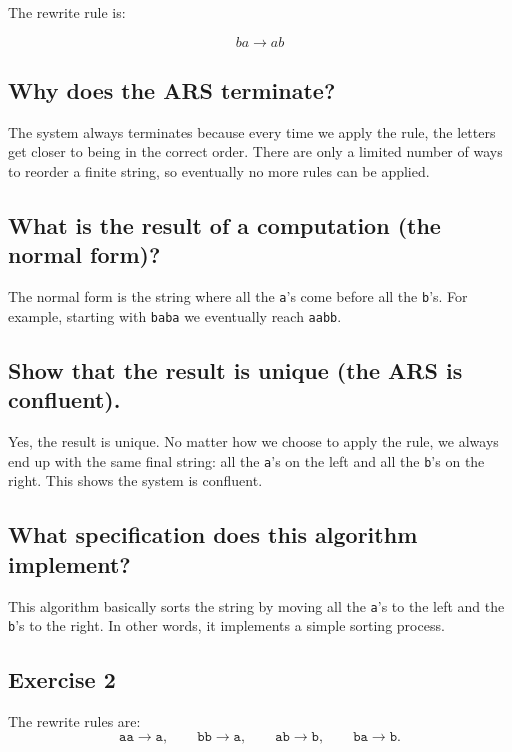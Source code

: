 \documentclass[12pt]{article}
\begin{document}
The rewrite rule is:

\[
    ba \to ab
\]

\subsection*{Why does the ARS terminate?}
The system always terminates because every time we apply the rule, the letters get closer to being in the correct order. There are only a limited number of ways to reorder a finite string, so eventually no more rules can be applied.

\subsection*{What is the result of a computation (the normal form)?}
The normal form is the string where all the \texttt{a}'s come before all the \texttt{b}'s. For example, starting with \texttt{baba} we eventually reach \texttt{aabb}.

\subsection*{Show that the result is unique (the ARS is confluent).}
Yes, the result is unique. No matter how we choose to apply the rule, we always end up with the same final string: all the \texttt{a}'s on the left and all the \texttt{b}'s on the right. This shows the system is confluent.

\subsection*{What specification does this algorithm implement?}
This algorithm basically sorts the string by moving all the \texttt{a}'s to the left and the \texttt{b}'s to the right. In other words, it implements a simple sorting process.

\subsection*{Exercise 2}

The rewrite rules are:
\[
\texttt{aa} \to \texttt{a},\qquad
\texttt{bb} \to \texttt{a},\qquad
\texttt{ab} \to \texttt{b},\qquad
\texttt{ba} \to \texttt{b}.
\]
\end{document}
